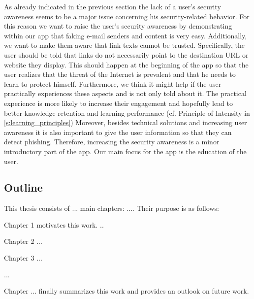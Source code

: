 As already indicated in the previous section the lack of a user's security awareness seems to be a major issue concerning his security-related behavior.
 For this reason we want to raise the user's security awareness by demonstrating within our app that faking e-mail senders and content is very easy.
 Additionally, we want to make them aware that link texts cannot be trusted.
Specifically, the user should be told that links do not necessarily point to the destination URL or website they display.
 This should happen at the beginning of the app so that the user realizes that the threat of the Internet is prevalent and that he needs to learn to protect himself.
 Furthermore, we think it might help if the user practically experiences these aspects and is not only told about it.
The practical experience is more likely to increase their engagement and hopefully lead to better knowledge retention and learning performance (cf. Principle of Intensity in \autoref{s:learning_principles}) 
 Moreover, besides technical solutions and increasing user awareness it is also important to give the user information so that they can detect phishing.
 Therefore, increasing the security awareness is a minor introductory part of the app.
 Our main focus for the app is the education of the user.

\subsection{Outline}


This thesis consists of ... main chapters: .... Their purpose is as follows:

Chapter 1 motivates this work.
..

Chapter 2 ...

Chapter 3 ...

...

Chapter ... finally summarizes this work and provides an outlook on future work.






